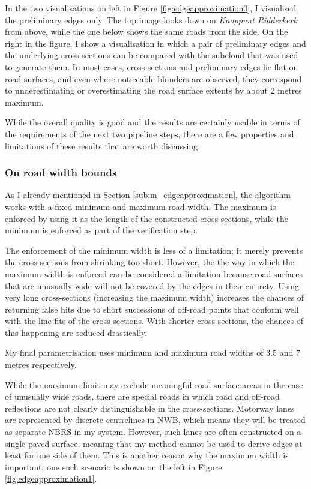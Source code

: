In the two visualisations on left in Figure \ref{fig:edgeapproximation0}, I visualised the preliminary edges only. The top image looks down on \textit{Knoppunt Ridderkerk} from above, while the one below shows the same roads from the side. On the right in the figure, I show a visualisation in which a pair of preliminary edges and the underlying cross-sections can be compared with the subcloud that was used to generate them. In most cases, cross-sections and preliminary edges lie flat on road surfaces, and even where noticeable blunders are observed, they correspond to underestimating or overestimating the road surface extents by about 2 metres maximum.

While the overall quality is good and the results are certainly usable in terms of the requirements of the next two pipeline steps, there are a few properties and limitations of these results that are worth discussing.

\subsubsection{On road width bounds}

As I already mentioned in Section \ref{sub:m_edgeapproximation}, the algorithm works with a fixed minimum and maximum road width. The maximum is enforced by using it as the length of the constructed cross-sections, while the minimum is enforced as part of the verification step.

The enforcement of the minimum width is less of a limitation; it merely prevents the cross-sections from shrinking too short. However, the the way in which the maximum width is enforced can be considered a limitation because road surfaces that are unusually wide will not be covered by the edges in their entirety. Using very long cross-sections (increasing the maximum width) increases the chances of returning false hits due to short successions of off-road points that conform well with the line fits of the cross-sections. With shorter cross-sections, the chances of this happening are reduced drastically.

My final parametrisation uses minimum and maximum road widths of 3.5 and 7 metres respectively.

While the maximum limit may exclude meaningful road surface areas in the case of unusually wide roads, there are special roads in which road and off-road reflections are not clearly distinguishable in the cross-sections. Motorway lanes are represented by discrete centrelines in NWB, which means they will be treated as separate NBRS in my system. However, such lanes are often constructed on a single paved surface, meaning that my method cannot be used to derive edges at least for one side of them. This is another reason why the maximum width is important; one such scenario is shown on the left in Figure \ref{fig:edgeapproximation1}.

